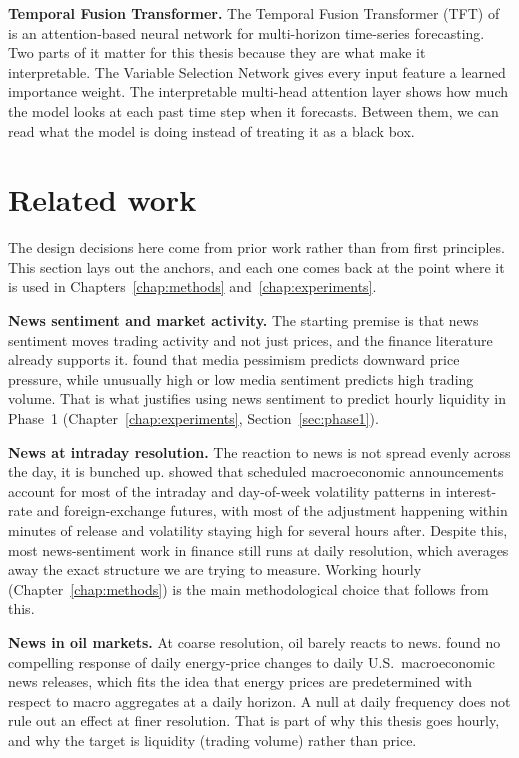 \textbf{Temporal Fusion Transformer.} The Temporal Fusion Transformer (TFT) of \citet{lim2021} is an attention-based neural network for multi-horizon time-series forecasting. Two parts of it matter for this thesis because they are what make it interpretable. The Variable Selection Network gives every input feature a learned importance weight. The interpretable multi-head attention layer shows how much the model looks at each past time step when it forecasts. Between them, we can read what the model is doing instead of treating it as a black box.

\section{Related work}\label{sec:related-work}

The design decisions here come from prior work rather than from first principles. This section lays out the anchors, and each one comes back at the point where it is used in Chapters~\ref{chap:methods} and~\ref{chap:experiments}.

\textbf{News sentiment and market activity.} The starting premise is that news sentiment moves trading activity and not just prices, and the finance literature already supports it. \citet{tetlock2007} found that media pessimism predicts downward price pressure, while unusually high or low media sentiment predicts high trading volume. That is what justifies using news sentiment to predict hourly liquidity in Phase~1 (Chapter~\ref{chap:experiments}, Section~\ref{sec:phase1}).

\textbf{News at intraday resolution.} The reaction to news is not spread evenly across the day, it is bunched up. \citet{ederington1993} showed that scheduled macroeconomic announcements account for most of the intraday and day-of-week volatility patterns in interest-rate and foreign-exchange futures, with most of the adjustment happening within minutes of release and volatility staying high for several hours after. Despite this, most news-sentiment work in finance still runs at daily resolution, which averages away the exact structure we are trying to measure. Working hourly (Chapter~\ref{chap:methods}) is the main methodological choice that follows from this.

\textbf{News in oil markets.} At coarse resolution, oil barely reacts to news. \citet{kilian_vega2011} found no compelling response of daily energy-price changes to daily U.S.\ macroeconomic news releases, which fits the idea that energy prices are predetermined with respect to macro aggregates at a daily horizon. A null at daily frequency does not rule out an effect at finer resolution. That is part of why this thesis goes hourly, and why the target is liquidity (trading volume) rather than price.

